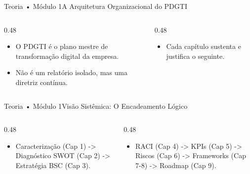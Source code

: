 \begin{senaiframe}{Teoria • Módulo 1}{A Arquitetura Organizacional do PDGTI}
  \begin{columns}[t]
    \begin{column}{0.48\textwidth}
      \begin{tcolorbox}[senaibluecard, title={Artefato Vivo}]
        \begin{itemize}
          \item O PDGTI é o plano mestre de transformação digital da empresa.
          \item Não é um relatório isolado, mas uma diretriz contínua.
        \end{itemize}
      \end{tcolorbox}
    \end{column}
    \begin{column}{0.48\textwidth}
      \begin{tcolorbox}[senaicard, title={Harmonia dos Conteúdos}]
        \begin{itemize}
          \item Cada capítulo sustenta e justifica o seguinte.
        \end{itemize}
      \end{tcolorbox}
    \end{column}
  \end{columns}
\end{senaiframe}

\begin{senaiframe}{Teoria • Módulo 1}{Visão Sistêmica: O Encadeamento Lógico}
  \begin{columns}[t]
    \begin{column}{0.48\textwidth}
      \begin{tcolorbox}[senaibluecard, title={Base \& Diagnóstico}]
        \begin{itemize}
          \item Caracterização (Cap 1) -> Diagnóstico SWOT (Cap 2) -> Estratégia BSC (Cap 3).
        \end{itemize}
      \end{tcolorbox}
    \end{column}
    \begin{column}{0.48\textwidth}
      \begin{tcolorbox}[senaigreencard, title={Controle \& Execução}]
        \begin{itemize}
          \item RACI (Cap 4) -> KPIs (Cap 5) -> Riscos (Cap 6) -> Frameworks (Cap 7-8) -> Roadmap (Cap 9).
        \end{itemize}
      \end{tcolorbox}
    \end{column}
  \end{columns}
\end{senaiframe}

